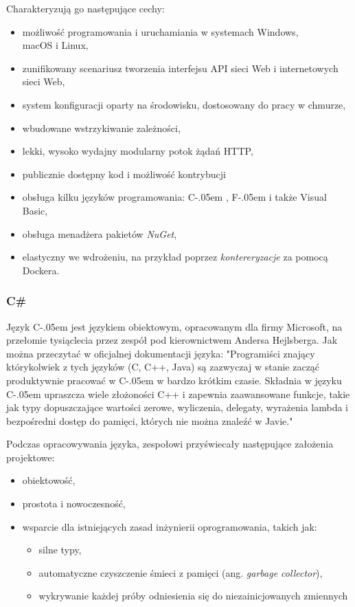 \documentclass[12pt]{article}
\newcommand{\Csharp}{%
  {\settoheight{\dimen0}{C}C\kern-.05em \resizebox{!}{\dimen0}{\raisebox{\depth}{\# }}}}
\newcommand{\Fsharp}{%
  {\settoheight{\dimen0}{F}F\kern-.05em \resizebox{!}{\dimen0}{\raisebox{\depth}{\# }}}}
\numberwithin{figure}{section}
\begin{document}
\begin{sloppypar}
Charakteryzują go następujące cechy:
\begin{itemize}
    \item możliwość programowania i uruchamiania w systemach Windows,\\ macOS i Linux,
    \item zunifikowany scenariusz tworzenia interfejsu API sieci Web i internetowych sieci Web,
    \item system konfiguracji oparty na środowisku, dostosowany do pracy w chmurze,
    \item wbudowane wstrzykiwanie zależności,
    \item lekki, wysoko wydajny modularny potok żądań HTTP,
    \item publicznie dostępny kod i możliwość kontrybucji
    \item obsługa kilku języków programowania: \Csharp, \Fsharp i także Visual Basic,
    \item obsługa menadżera pakietów \textit{NuGet},
    \item elastyczny we wdrożeniu, na przykład poprzez \textit{kontereryzacje} za pomocą Dockera.
\end{itemize}
\subsubsection{C\#}
Język \Csharp jest językiem obiektowym, opracowanym dla firmy Microsoft, na przełomie tysiąclecia przez zespół pod kierownictwem Andersa Hejlsberga. Jak można przeczytać w oficjalnej dokumentacji języka: 
"Programiści znający którykolwiek z tych języków (C, C++, Java) są zazwyczaj w stanie zacząć produktywnie pracować w \Csharp w bardzo krótkim czasie. Składnia w języku \Csharp upraszcza wiele złożoności C++ i zapewnia zaawansowane funkcje, takie jak typy dopuszczające wartości zerowe, wyliczenia, delegaty, wyrażenia lambda i bezpośredni dostęp do pamięci, których nie można znaleźć w Javie." \cite{csharp} 
    
Podczas opracowywania języka, zespołowi przyświecały następujące założenia projektowe:
\begin{itemize}
    \item obiektowość,
    \item prostota i nowoczesność,
    \item wsparcie dla istniejących zasad inżynierii oprogramowania, takich jak:
    \begin{itemize}
       \item silne typy,
       \item automatyczne czyszczenie śmieci z pamięci (ang. \textit{garbage collector}),
       \item wykrywanie każdej próby odniesienia się do niezainicjowanych zmiennych
    \end{itemize}
\end{itemize}
    

\end{sloppypar}
\end{document}
